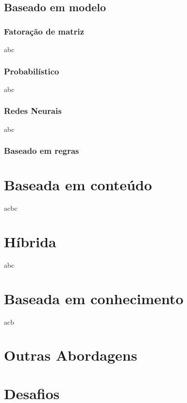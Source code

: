     
    \subsection{Baseado em modelo}
    
        
        \subsubsection{Fatoração de matriz}
        abc
        
        \subsubsection{Probabilístico}
        abc
        
        \subsubsection{Redes Neurais}
        
        abc
        \subsubsection{Baseado em regras}
        

    
\section{Baseada em conteúdo}
acbc
        
\section{Híbrida}
    abc
    
\section{Baseada em conhecimento}
    acb
    
\section{Outras Abordagens}
    
\section{Desafios}
    
